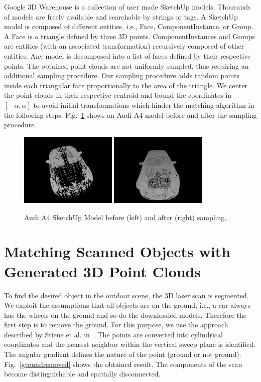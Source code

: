 \documentclass{llncs}
\begin{document}
Google 3D Warehouse is a collection of user made SketchUp
models. Thousands of models are freely available and searchable by
strings or tags. A SketchUp model is composed of different entities,
i.e., Face, ComponentInstance, or Group. A Face is a triangle defined
by three 3D points. ComponentInstances and Groups are entities (with
an associated transformation) recursively composed of other
entities. Any model is decomposed into a list of faces defined by
their respective points. The obtained point clouds are not uniformly
sampled, thus requiring an additional sampling procedure. Our sampling
procedure adds random points inside each triangular face
proportionally to the area of the triangle. We center the point clouds
in their respective centroid and bound the coordinates in $[-\alpha,
  \alpha]$ to avoid initial transformations which hinder the matching
algorithm in the following steps. Fig.~\ref{audia4resampled} shows
an Audi A4 model before and after the sampling procedure.

  \begin{figure}
    \centering
    \includegraphics[height=35mm]{AudiA4_pointcloud}
    \hspace*{3mm}
    \includegraphics[height=35mm]{AudiA4_resampled}
    \caption{Audi A4 SketchUp Model before (left) and after (right) sampling.}
    \label{audia4resampled}
  \end{figure}

  
\section{Matching Scanned Objects with Generated 3D Point Clouds}

To find the desired object in the outdoor scene, the 3D laser scan is
segmented. We exploit the assumptions that all objects are on the
ground, i.e., a car always has the wheels on the ground and so do the
downloaded models. Therefore the first step is to remove the
ground. For this purpose, we use the approach described by Stiene et
al. in~\cite{Stiene:2006}. The points are converted into cylindrical
coordinates and the nearest neighbor within the vertical sweep plane
is identified. The angular gradient defines the nature of the point
(ground or not ground). Fig.~\ref{groundremoved} shows the obtained
result. The components of the scan become distinguishable and
spatially disconnected.
  
\end{document}
